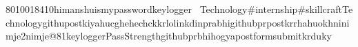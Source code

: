 8010018410himanshuismypasswordkeyloggerTechnology#internship#skillcraftTechnologygithupostkiyahucghehechckkrlolinkdinprabhigithubprpostkrrhahuokhninimje2nimje@81keyloggerPassStrengthgithubprbhihogyapostformsubmitkrduky